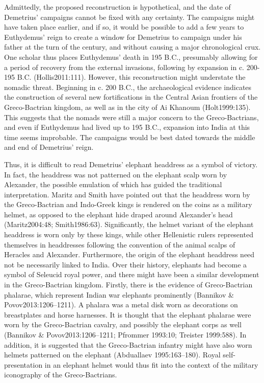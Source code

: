 \documentclass{ijsra}
\begin{document}
Admittedly, the proposed reconstruction is hypothetical, and the date of Demetrius’ campaigns cannot be fixed with any certainty.
The campaigns might have taken place earlier, and if so, it would be possible to add a few years to Euthydemus’ reign
to create a window for Demetrius to campaign under his father at the turn of the century,
and without causing a major chronological crux.
One scholar thus places Euthydemus’ death in 195 B.C., presumably allowing for a period of recovery from the external invasions,
following by expansion in c. 200-195 B.C. (Hollis2011:111).
However, this reconstruction might understate the nomadic threat.
Beginning in c. 200 B.C., the archaeological evidence indicates the construction of several new fortifications in the Central Asian
frontiers of the Greco-Bactrian kingdom, as well as in the city of Ai Khanoum (Holt1999:135).
This suggests that the nomads were still a major concern to the Greco-Bactrians, and even if Euthydemus had lived up to 195 B.C.,
expansion into India at this time seems improbable.
The campaigns would be best dated towards the middle and end of Demetrius’ reign.

Thus, it is difficult to read Demetrius’ elephant headdress as a symbol of victory.
In fact, the headdress was not patterned on the elephant scalp worn by Alexander,
the possible emulation of which has guided the traditional interpretation.
Maritz and Smith have pointed out that the headdress worn by the Greco-Bactrian and Indo-Greek kings is rendered on the coins
as a military helmet, as opposed to the elephant hide draped around Alexander’s head (Maritz2004:48; Smith1986:63).
Significantly, the helmet variant of the elephant headdress is worn only by these kings, while other Hellenistic rulers
represented themselves in headdresses following the convention of the animal scalps of Heracles and Alexander.
Furthermore, the origin of the elephant headdress need not be necessarily linked to India.
Over their history, elephants had become a symbol of Seleucid royal power, and there might have been a similar development in
the Greco-Bactrian kingdom.
Firstly, there is the evidence of Greco-Bactrian phalarae, which represent Indian war elephants prominently (Bannikov & Povov2013:1206–1211).
A phalara was a metal disk worn as decorations on breastplates and horse harnesses.
It is thought that the elephant phalarae were worn by the Greco-Bactrian cavalry, and possibly the elephant corps as well 
(Bannikov & Povov2013:1206–1211; Pfrommer 1993:10; Treister 1999:588).
In addition, it is suggested that the Greco-Bactrian infantry might have also worn helmets patterned on the elephant (Abduallaev 1995:163–180).
Royal self-presentation in an elephant helmet would thus fit into the context of the military iconography of the Greco-Bactrians.
\end{document}
